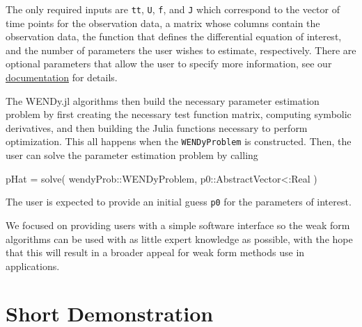 \documentclass{juliacon}
\begin{document}
The only required inputs are \texttt{tt}, \texttt{U}, \texttt{f}, and \texttt{J} which correspond to the vector of time points for the observation data, a matrix whose columns contain the observation data, the function that defines the differential equation of interest, and the number of parameters the user wishes to estimate, respectively. There are optional parameters that allow the user to specify more information, see our \href{https://nrummel.github.io/WENDy.jl/stable/}{documentation} for details.

The WENDy.jl algorithms then build the necessary parameter estimation problem by first creating the necessary test function matrix, computing symbolic derivatives, and then building the Julia functions necessary to perform optimization. This all happens when the 
\texttt{WENDyProblem} %
is constructed. Then, the user can solve the parameter estimation problem by calling 
\begin{jllisting}
    pHat = solve(
        wendyProb::WENDyProblem, 
        p0::AbstractVector{<:Real}
    )
\end{jllisting}
The user is expected to provide an initial guess \texttt{p0} for the parameters of interest.

We focused on providing users with a simple software interface so the weak form algorithms can be used with as little expert knowledge as possible, with the hope that this will result in a broader appeal for weak form methods use in applications.

\section{Short Demonstration}
\end{document}
